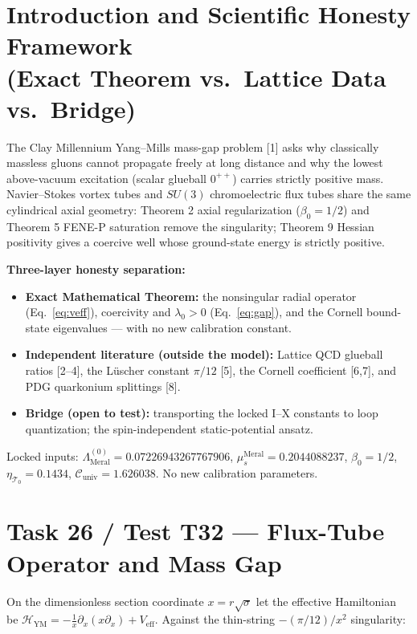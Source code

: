 \documentclass[12pt,a4paper]{article}
\begin{document}
\section{Introduction and Scientific Honesty Framework \\ (Exact Theorem vs.\ Lattice Data vs.\ Bridge)}

The Clay Millennium Yang--Mills mass-gap problem [1] asks why classically
massless gluons cannot propagate freely at long distance and why the lowest
above-vacuum excitation (scalar glueball $0^{++}$) carries strictly positive
mass. Navier--Stokes vortex tubes and $SU(3)$ chromoelectric flux tubes share
the same cylindrical axial geometry: Theorem 2 axial regularization
($\beta_0=1/2$) and Theorem 5 FENE-P saturation remove the singularity;
Theorem 9 Hessian positivity gives a coercive well whose ground-state energy
is strictly positive.

\textbf{Three-layer honesty separation:}
\begin{itemize}
    \item \textbf{Exact Mathematical Theorem:} the nonsingular radial operator
    (Eq.~\ref{eq:veff}), coercivity and $\lambda_0>0$ (Eq.~\ref{eq:gap}), and
    the Cornell bound-state eigenvalues --- with no new calibration constant.
    \item \textbf{Independent literature (outside the model):} Lattice QCD
    glueball ratios [2--4], the L\"uscher constant $\pi/12$ [5], the Cornell
    coefficient [6,7], and PDG quarkonium splittings [8].
    \item \textbf{Bridge (open to test):} transporting the locked
    I--X constants to loop quantization; the spin-independent static-potential
    ansatz.
\end{itemize}
Locked inputs: $\Lambda_{\mathrm{Meral}}^{(0)} = 0.07226943267767906$,
$\mu_s^{\mathrm{Meral}} = 0.2044088237$, $\beta_0 = 1/2$,
$\eta_{\mathcal{T}_0} = 0.1434$,
$\mathcal{C}_{\mathrm{univ}} = 1.626038$. No new calibration parameters.

\section{Task 26 / Test T32 --- Flux-Tube Operator and Mass Gap}

On the dimensionless section coordinate $x=r\sqrt{\sigma}$ let the effective
Hamiltonian be
$\mathcal{H}_{\mathrm{YM}}=-\frac{1}{x}\partial_x(x\partial_x)+V_{\mathrm{eff}}$.
Against the thin-string $-(\pi/12)/x^2$ singularity:
\end{document}
